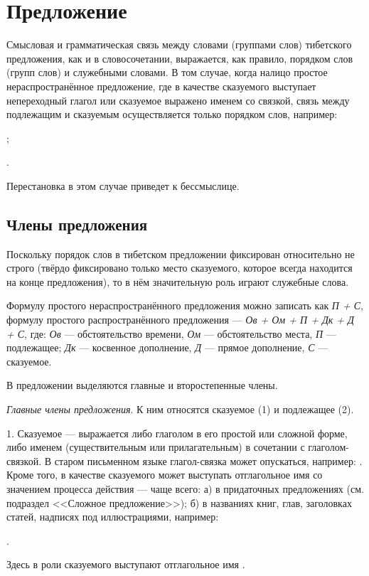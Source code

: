\section{Предложение}

Смысловая и грамматическая связь между словами (группами слов) тибетского предложения, как и в словосочетании, выражается, как правило, порядком слов (групп слов) и служебными словами. В том случае, когда налицо простое нераспространённое предложение, где в качестве сказуемого выступает непереходный глагол или сказуемое выражено именем со связкой, связь между подлежащим и сказуемым осуществляется только порядком слов, например:
\begin{prfsample}
	\item {};
	\item {}.
\end{prfsample}
Перестановка в этом случае приведет к бессмыслице.

\subsection{Члены предложения}

Поскольку порядок слов в тибетском предложении фиксирован относительно не строго (твёрдо фиксировано только место сказуемого, которое всегда находится на конце предложения), то в нём значительную роль играют служебные слова.

Формулу простого нераспространённого предложения можно записать как \emph{П + С}, формулу простого распространённого предложения --- \emph{Ов + Ом + П + Дк + Д + С}, где:
\emph{Ов} --- обстоятельство времени,
\emph{Ом} --- обстоятельство места,
\emph{П} --- подлежащее;
\emph{Дк} --- косвенное дополнение,
\emph{Д} --- прямое дополнение,
\emph{С} --- сказуемое.

В предложении выделяются главные и второстепенные члены.

\emph{Главные члены предложения}. К ним относятся сказуемое (1) и подлежащее (2).

1. Сказуемое --- выражается либо глаголом в его простой или сложной форме, либо именем (существительным или прилагательным) в сочетании с глаголом-связкой. В старом письменном языке глагол-связка может опускаться, например:
.
Кроме того, в качестве сказуемого может выступать отглагольное имя со значением процесса действия --- чаще всего: а) в придаточных предложениях (см. подраздел <<Сложное предложение>>); б) в названиях книг, глав, заголовках статей, надписях
под иллюстрациями, например:
\begin{prfsample}
	\item {}.
\end{prfsample}
Здесь в роли сказуемого выступают отглагольное имя .

